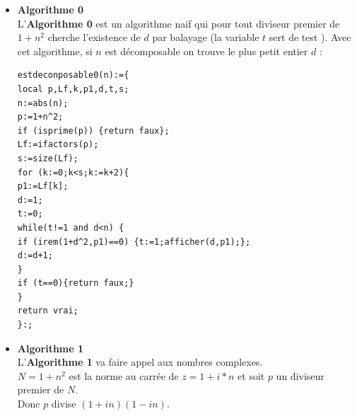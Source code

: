 \documentclass[a4paper,11pt]{book}
\begin{document}
\begin{itemize}
\item{\bf Algorithme 0}\\
L'{\bf Algorithme 0} est un algorithme naif qui pour tout diviseur premier
de $1+n^2$ cherche l'existence de $d$ par balayage (la variable $t$ sert de 
test ). Avec cet algorithme, si $n$ est d\'ecomposable on trouve le plus petit 
entier $d$ : 
\begin{verbatim}
estdeconposable0(n):={
local p,Lf,k,p1,d,t,s;
n:=abs(n);
p:=1+n^2;
if (isprime(p)) {return faux};
Lf:=ifactors(p);
s:=size(Lf);
for (k:=0;k<s;k:=k+2){
p1:=Lf[k];
d:=1;
t:=0;
while(t!=1 and d<n) {
if (irem(1+d^2,p1)==0) {t:=1;afficher(d,p1);};
d:=d+1;
}
if (t==0){return faux;}
}
return vrai;
}:;
\end{verbatim} 
\item{\bf Algorithme 1}\\
L'{\bf Algorithme 1} va faire appel aux nombres complexes.\\
$N=1+n^2$ est la norme au carr\'ee de $z=1+i*n$ et soit $p$ un diviseur premier
de $N$.\\
Donc $p$ divise $(1+in)(1-in)$.\\


\end{itemize}
\end{document}
